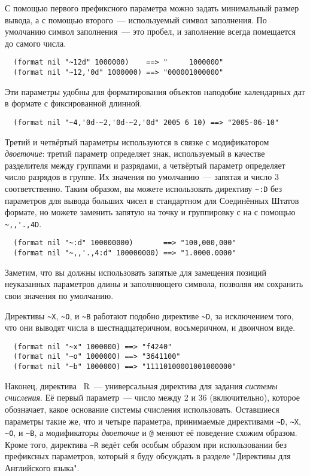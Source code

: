 {С помощью первого префиксного параметра можно задать минимальный размер вывода, а с
помощью второго~--- используемый символ заполнения. По умолчанию символ заполнения~--- это
пробел, и заполнение всегда помещается до самого числа.

\begin{verbatim}
  (format nil "~12d" 1000000)    ==> "     1000000"
  (format nil "~12,'0d" 1000000) ==> "000001000000"
\end{verbatim}

Эти параметры удобны для форматирования объектов наподобие календарных дат в формате с
фиксированной длинной.

\begin{verbatim}
  (format nil "~4,'0d-~2,'0d-~2,'0d" 2005 6 10) ==> "2005-06-10"
\end{verbatim}

Третий и четвёртый параметры используются в связке с модификатором \textit{двоеточие}:
третий параметр определяет знак, используемый в качестве разделителя между группами и
разрядами, а четвёртый параметр определяет число разрядов в группе. Их значения по
умолчанию~--- запятая и число 3 соответственно. Таким образом, вы можете использовать
директиву \lstinline!~:D! без параметров для вывода больших чисел в стандартном для
Соединённых Штатов формате, но можете заменить запятую на точку и группировку с 
на  с помощью \lstinline!~,,'.,4D!.

\begin{verbatim}
  (format nil "~:d" 100000000)       ==> "100,000,000"
  (format nil "~,,'.,4:d" 100000000) ==> "1.0000.0000"
\end{verbatim}

Заметим, что вы должны использовать запятые для замещения позиций неуказанных параметров
длины и заполняющего символа, позволяя им сохранить свои значения по умолчанию.

Директивы \lstinline!~X!, \lstinline!~O!, и \lstinline!~B! работают подобно директиве
\lstinline!~D!, за исключением того, что они выводят числа в шестнадцатеричном,
восьмеричном, и двоичном виде.

\begin{verbatim}
  (format nil "~x" 1000000) ==> "f4240"
  (format nil "~o" 1000000) ==> "3641100"
  (format nil "~b" 1000000) ==> "11110100001001000000"
\end{verbatim}

Наконец, директива ~R~--- универсальная директива для задания \textit{системы счисления}. Её
первый параметр~--- число между 2 и 36 (включительно), которое обозначает, какое основание
системы счисления использовать. Оставшиеся параметры такие же, что и четыре параметра,
принимаемые директивами \lstinline!~D!, \lstinline!~X!, \lstinline!~O!, и \lstinline!~B!,
а модификаторы \textit{двоеточие} и \lstinline!@! меняют её поведение схожим
образом. Кроме того, директива \lstinline!~R! ведёт себя особым образом при использовании
без префиксных параметров, который я буду обсуждать в разделе "Директивы для Английского
языка".

}
